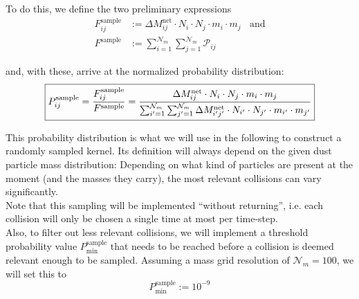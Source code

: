     To do this, we define the two preliminary expressions 
    \begin{align}
        F_{ij}^\text{sample} 
            &:= \Delta M_{ij}^\text{net} \cdot N_i \cdot N_j \cdot m_i \cdot m_j 
        \ \ \ \ \text{and} \\
        F^\text{sample} 
            &:= \sum_{i=1}^{\mathcal N_m} \sum_{j=1}^{\mathcal N_m} \mathcal P_{ij}
    \end{align}

    and, with these, arrive at the normalized probability distribution: 
    \begin{align}
        \boxed{
        P_{ij}^\text{sample} 
            = \frac{F_{ij}^\text{sample}}{F^\text{sample}} 
            = \frac{
                \Delta M_{ij}^\text{net} \cdot N_i \cdot N_j \cdot m_i \cdot m_j
            }{
                \sum_{i'=1}^{\mathcal N_m} \sum_{j'=1}^{\mathcal N_m} 
                \Delta M_{i'j'}^\text{net} \cdot N_{i'} \cdot N_{j'} 
                \cdot m_{i'} \cdot m_{j'}
            }
        }
    \end{align}

    This probability distribution is what we will use in the following to construct a randomly
    sampled kernel. Its definition will always depend on the given dust particle mass 
    distribution: Depending on 
    what kind of particles are present at the moment (and the masses they carry), the most 
    relevant collisions can vary significantly. \\ 

    Note that this sampling will be implemented ``without returning'', i.e. each collision 
    will only be chosen a single time at most per time-step. \\

    Also, to filter out less relevant collisions, we will implement a threshold probability 
    value $P^\text{sample}_\text{min}$ that needs to be reached before a collision is deemed 
    relevant enough to be sampled. Assuming a mass grid resolution of $\mathcal N_m=100$, we will 
    set this to
    \begin{equation}
        P^\text{sample}_\text{min} := 10^{-9}
    \end{equation}

